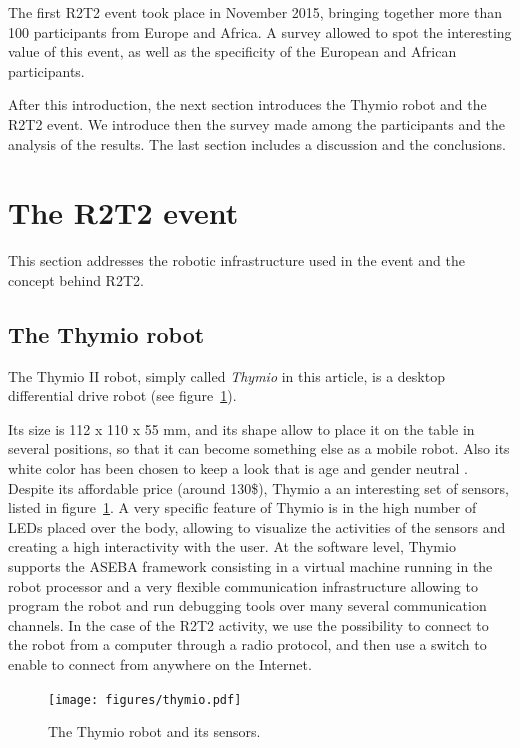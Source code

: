 \documentclass{intech-journal}
\begin{document}
The first R2T2 event took place in November 2015, bringing together more than 100 participants from Europe and Africa. 
A survey allowed to spot the interesting value of this event, as well as the specificity of the European and African participants.

After this introduction, the next section introduces the Thymio robot and the R2T2 event. 
We introduce then the survey made among the participants and the analysis of the results. 
The last section includes a discussion and the conclusions.


\section{The R2T2 event}

This section addresses the robotic infrastructure used in the event and the concept behind R2T2.

\subsection{The Thymio robot}

The Thymio II robot, simply called \textit{Thymio} in this article, is a desktop differential drive robot (see figure~\ref{fig:thymio}).

Its size is 112 x 110 x 55 mm, and its shape allow to place it on the table in several positions, so that it can become something else as a mobile robot.
Also its white color has been chosen to keep a look that is age and gender neutral \cite{riedo2013thymio}.
Despite its affordable price (around 130\$), Thymio a an interesting set of sensors, listed in figure~\ref{fig:thymio}.
A very specific feature of Thymio is in the high number of LEDs placed over the body, allowing to visualize the activities of the sensors and creating a high interactivity with the user.
At the software level, Thymio supports the ASEBA framework\cite{magnenat2010aseba} consisting in a virtual machine running in the robot processor and a very flexible communication infrastructure allowing to program the robot and run debugging tools over many several communication channels. 
In the case of the R2T2 activity, we use the possibility to connect to the robot from a computer through a radio protocol, and then use a switch to enable to connect from anywhere on the Internet.

\begin{figure}[ht]
 \centering
    \texttt{[image: figures/thymio.pdf]}
  \caption{The Thymio robot and its sensors.}
  \label{fig:thymio} 
\end{figure}
\end{document}

